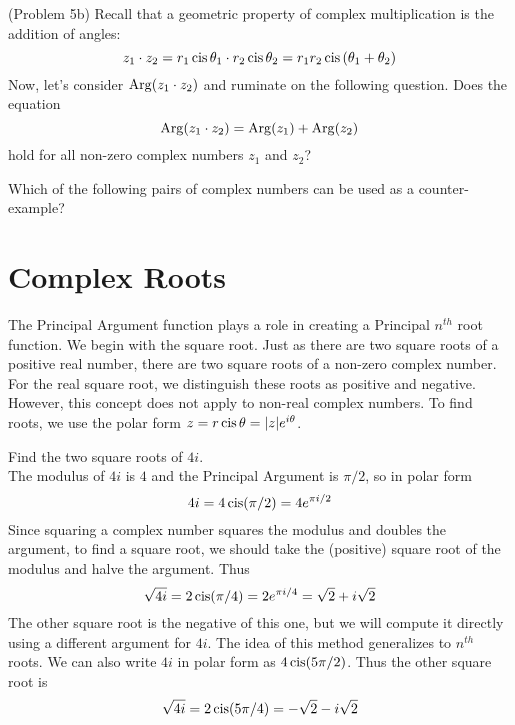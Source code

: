 \documentclass[handout]{ximera}
\begin{document}
\begin{problem}(Problem 5b)
Recall that a geometric property of complex multiplication is the addition of angles:
\[
z_1 \cdot z_2 = r_1 \operatorname{cis}\theta_1 \cdot r_2 \operatorname{cis}\theta_2 = r_1r_2\operatorname{cis}\left(\theta_1+\theta_2\right)
\]
Now, let's consider $\operatorname{Arg}(z_1 \cdot z_2)$ and ruminate on the following question.
Does the equation 
\[
\operatorname{Arg}(z_1\cdot z_2) = \operatorname{Arg}(z_1) + \operatorname{Arg}(z_2)
\]
hold for all non-zero complex numbers $z_1$ and $z_2$?
\begin{multipleChoice}
\end{multipleChoice}
Which of the following pairs of complex numbers can be used as a counter-example?
\begin{selectAll}
\end{selectAll}

\end{problem}



\section{Complex Roots}

The Principal Argument function plays a role in creating a Principal $n^{th}$ root function.
We begin with the square root. Just as there are two square roots of a positive real number, there are two square roots of a non-zero complex number.
For the real square root, we distinguish these roots as positive and negative. However, this concept does not apply to non-real 
complex numbers. To find roots, we use the polar form $z = r\operatorname{cis}\theta = |z|e^{i\theta}$.

\begin{example}[Example 6] 
Find the two square roots of $4i$. \\
The modulus of $4i$ is $4$ and the Principal Argument is $\pi/2$, so in polar form
\[
4i = 4\operatorname{cis}(\pi/2) = 4e^{\pi i/2}
\]
Since squaring a complex number squares the modulus and doubles the argument, 
to find a square root, we should take the (positive) square root of the modulus and halve the argument.
Thus
\[
\sqrt{4i} = 2\operatorname{cis}(\pi/4) = 2e^{\pi i/4} = \sqrt 2 + i\sqrt 2
\]
The other square root is the negative of this one, but we will compute it directly using a different argument for $4i$.
The idea of this method generalizes to $n^{th}$ roots.
We can also write $4i$ in polar form as $4\operatorname{cis}(5\pi/2)$.  Thus the other square root is
\[
\sqrt{4i} = 2\operatorname{cis}(5\pi/4) = -\sqrt 2 - i\sqrt 2
\]

\end{example}
\end{document}
